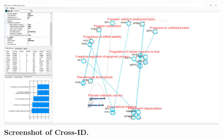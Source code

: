 \begin{figure}[!htb]
  \center
  \includegraphics[]{Chapter.2/Figures/f2.png}
  \captionsetup{singlelinecheck = false, format= hang}
  \caption{\textbf{Screenshot of Cross-ID.}}
  \label{fig:fig2.2}
\end{figure}

